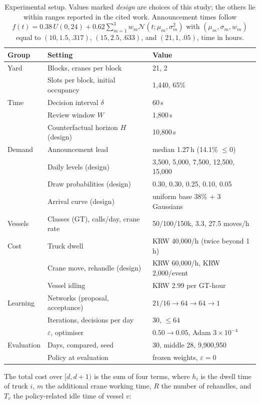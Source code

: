 \documentclass[a4paper]{llncs}
\begin{document}
\begin{table}[bp]
\centering
\caption{Experimental setup. Values marked \emph{design} are choices of
this study; the others lie within ranges reported in the cited work.
Announcement times follow
$f(t)=0.38\,U(0,24)+0.62\sum_{m=1}^{3}w_m\mathcal N(t;\mu_m,\sigma_m^2)$
with $(\mu_m,\sigma_m,w_m)$ equal to $(10,1.5,.317)$, $(15,2.5,.633)$,
and $(21,1,.05)$, time in hours.}
\label{tab:setup}
\small
\setlength{\tabcolsep}{4pt}
\begin{tabular}{@{}l l@{\hspace{0.9em}} l@{}}
\toprule
Group & Setting & Value \\
\midrule
Yard & Blocks, cranes per block & 21, 2 \\
 & Slots per block, initial occupancy & 1{,}440, 65\% \\
\midrule
Time & Decision interval $\delta$ & 60\,s \\
 & Review window $W$ & 1{,}800\,s \\
 & Counterfactual horizon $H$ (design) & 10{,}800\,s \\
\midrule
Demand & Announcement lead & median 1.27\,h (14.1\% $\le0$) \\
 & Daily levels (design) & 3{,}500, 5{,}000, 7{,}500, 12{,}500, 15{,}000 \\
 & Draw probabilities (design) & 0.30, 0.30, 0.25, 0.10, 0.05 \\
 & Arrival curve (design) & uniform base 38\% $+$ 3 Gaussians \\
\midrule
Vessels & Classes (GT), calls/day, crane rate & 50/100/150k, 3.3, 27.5 moves/h \\
\midrule
Cost & Truck dwell & KRW 40{,}000/h (twice beyond 1\,h) \\
 & Crane move, rehandle (design) & KRW 60{,}000/h, KRW 2{,}000/event \\
 & Vessel idling & KRW 2.99 per GT-hour~\cite{ref25} \\
\midrule
Learning & Networks (proposal, acceptance) & $21/16\!\to\!64\!\to\!64\!\to\!1$ \\
 & Iterations, decisions per day & 30, $\le64$ \\
 & $\varepsilon$, optimiser & $0.50\!\to\!0.05$, Adam $3\times10^{-4}$ \\
\midrule
Evaluation & Days, compared, seed & 30, middle 28, 9{,}900{,}950 \\
 & Policy at evaluation & frozen weights, $\varepsilon=0$ \\
\bottomrule
\end{tabular}
\end{table}
The total cost over $[d,d+1)$ is the sum of four terms, where $h_i$ is
the dwell time of truck $i$, $m$ the additional crane working time, $R$
the number of rehandles, and $T_v$ the policy-related idle time of
vessel $v$:
\end{document}
